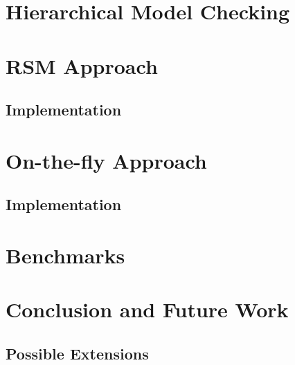\documentclass[a4paper, 12pt, twoside]{report}
\theoremstyle{plain}
\begin{document}
	\chapter{Hierarchical Model Checking}
	
	\chapter{RSM Approach}
	
	\section{Implementation}
	
	
	\chapter{On-the-fly Approach}
	\section{Implementation}
	
	\chapter{Benchmarks}
	
	\chapter{Conclusion and Future Work}
	
	\section{Possible Extensions}
	
	
\end{document}
